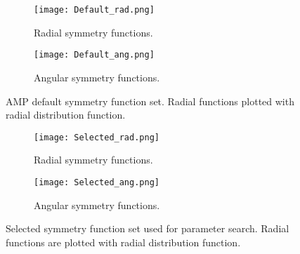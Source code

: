 \begin{figure}[H]
\begin{adjustbox}{max width=1.2\linewidth,center}
\centering
  \begin{subfigure}[b]{0.55\textwidth}
      \texttt{[image: Default\_rad.png]}
      \caption{Radial symmetry functions.}
    \label{fig:f1}
  \end{subfigure}
  \hfill
  \begin{subfigure}[b]{0.55\textwidth}
      \texttt{[image: Default\_ang.png]}
      \caption{Angular symmetry functions.}
    \label{fig:f2}
  \end{subfigure}
\end{adjustbox}
    \caption{AMP default symmetry function set. Radial functions
    plotted with radial distribution function.}
    \label{fig:default}
\end{figure}

\begin{figure}[H]
\begin{adjustbox}{max width=1.2\linewidth,center}
\centering
  \begin{subfigure}[b]{0.55\textwidth}
      \texttt{[image: Selected\_rad.png]}
      \caption{Radial symmetry functions.}
    \label{fig:f1}
  \end{subfigure}
  \hfill
  \begin{subfigure}[b]{0.55\textwidth}
      \texttt{[image: Selected\_ang.png]}
      \caption{Angular symmetry functions.}
    \label{fig:f2}
  \end{subfigure}
\end{adjustbox}
    \caption{Selected symmetry function set used for parameter search.
    Radial functions are plotted with radial distribution function.}
    \label{fig:selected}
\end{figure}

